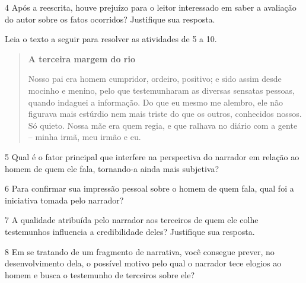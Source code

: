 \num{4} Após a reescrita, houve prejuízo para o leitor interessado em
saber a avaliação do autor sobre os fatos ocorridos? Justifique sua
resposta.


Leia o texto a seguir para resolver as atividades de 5 a 10.

\begin{quote}
\textbf{A terceira margem do rio}

Nosso pai era homem cumpridor, ordeiro, positivo; e sido assim desde
mocinho e menino, pelo que testemunharam as diversas sensatas pessoas,
quando indaguei a informação. Do que eu mesmo me alembro, ele não
figurava mais estúrdio nem mais triste do que os outros, conhecidos
nossos. Só quieto. Nossa mãe era quem regia, e que ralhava no diário com
a gente -- minha irmã, meu irmão e eu.
\end{quote}


\num{5} Qual é o fator principal que interfere na perspectiva do
narrador em relação ao homem de quem ele fala, tornando-a ainda mais
subjetiva?


\num{6} Para confirmar sua impressão pessoal sobre o homem de quem fala,
qual foi a iniciativa tomada pelo narrador?


\num{7} A qualidade atribuída pelo narrador aos terceiros de quem ele
colhe testemunhos influencia a credibilidade deles? Justifique sua
resposta.


\num{8} Em se tratando de um fragmento de narrativa, você consegue
prever, no desenvolvimento dela, o possível motivo pelo qual o narrador
tece elogios ao homem e busca o testemunho de terceiros sobre ele?

